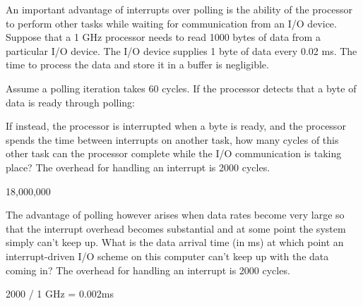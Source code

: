 \begin{blocksection}
An important advantage of interrupts over polling is the ability of the processor to perform other tasks while waiting for communication from an I/O device. Suppose that a 1 GHz processor needs to read 1000 bytes of data from a particular I/O device. The I/O device supplies 1 byte of data every 0.02 ms. The time to process the data and store it in a buffer is negligible.

\question 
Assume a polling iteration takes 60 cycles. If the processor detects that a byte of data is ready through polling:

\question
If instead, the processor is interrupted when a byte is ready, and the processor spends the time between interrupts on another task, how many cycles of this other task can the processor complete while the I/O communication is taking place? The overhead for handling an interrupt is 2000 cycles. 

\begin{solution}[0.5in]
18,000,000
\end{solution}

\question
The advantage of polling however arises when data rates become very large so that the interrupt overhead becomes substantial and at some point the system simply can’t keep up. What is the data arrival time (in ms) at which point an interrupt-driven I/O scheme on this computer can’t keep up with the data coming in? The overhead for handling an interrupt is 2000 cycles. 
\begin{solution}[0.5in] 
2000 / 1 GHz = 0.002ms
\end{solution}

\end{blocksection}
